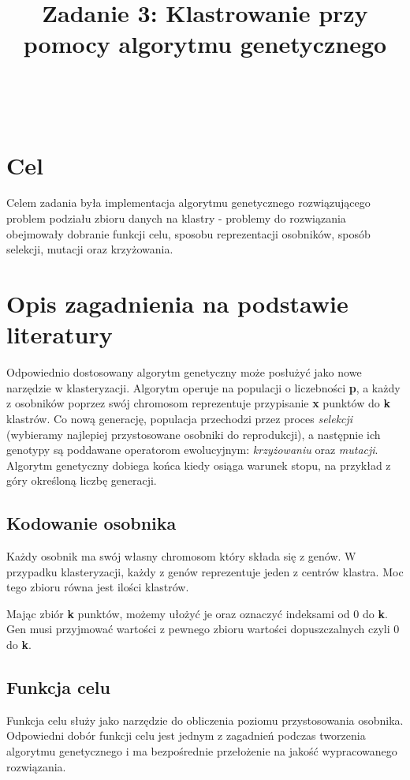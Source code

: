 \documentclass{classrep}
\author{%
  \\
  \studentinfo[234067@edu.p.lodz.pl]{Bartosz Jurczewski}{234067}\\
  \studentinfo[234106@edu.p.lodz.pl]{Karol Podlewski}{234106}%
}
\title{Zadanie 3: Klastrowanie przy pomocy algorytmu genetycznego}
\begin{document}
\maketitle
\thispagestyle{fancyplain}

\clearpage

\section{Cel}
Celem zadania była implementacja algorytmu genetycznego rozwiązującego problem podziału zbioru danych na klastry - problemy do rozwiązania obejmowały dobranie funkcji celu, sposobu reprezentacji osobników, sposób selekcji, mutacji oraz krzyżowania. 

\section{Opis zagadnienia na podstawie literatury}
Odpowiednio dostosowany algorytm genetyczny może posłużyć jako nowe narzędzie w klasteryzacji. Algorytm operuje na populacji o liczebności \textbf{p}, a każdy z osobników poprzez swój chromosom reprezentuje przypisanie \textbf{x} punktów do \textbf{k} klastrów. Co nową generację, populacja przechodzi przez proces \textit{selekcji} (wybieramy najlepiej przystosowane osobniki do reprodukcji), a następnie ich genotypy są poddawane operatorom ewolucyjnym: \textit{krzyżowaniu} oraz \textit{mutacji}. Algorytm genetyczny dobiega końca kiedy osiąga warunek stopu, na przykład z góry określoną liczbę generacji. \cite{cluster} \cite{kmeans}

\subsection{Kodowanie osobnika}
Każdy osobnik ma swój własny chromosom który składa się z genów. W przypadku klasteryzacji, każdy z genów reprezentuje jeden z centrów klastra. Moc tego zbioru równa jest ilości klastrów. 

Mając zbiór \textbf{k} punktów, możemy ułożyć je oraz oznaczyć indeksami od 0 do \textbf{k}. Gen musi przyjmować wartości z pewnego zbioru wartości dopuszczalnych czyli 0 do \textbf{k}.

\subsection{Funkcja celu}
Funkcja celu służy jako narzędzie do obliczenia poziomu przystosowania osobnika.
Odpowiedni dobór funkcji celu jest jednym z zagadnień podczas tworzenia algorytmu genetycznego i ma bezpośrednie przełożenie na jakość wypracowanego rozwiązania.
\end{document}
